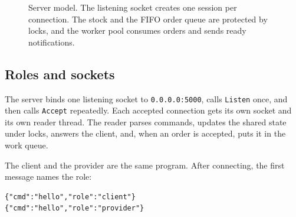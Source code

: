 \documentclass[12pt,a4paper]{article}
\begin{document}
\begin{figure}[H]
\centering
{}
\caption{Server model. The listening socket creates one session per connection.
The stock and the FIFO order queue are protected by locks, and the worker pool
consumes orders and sends ready notifications.}
\label{fig:server-model}
\end{figure}

\subsection{Roles and sockets}

The server binds one listening socket to \texttt{0.0.0.0:5000}, calls
\texttt{Listen} once, and then calls \texttt{Accept} repeatedly. Each accepted
connection gets its own socket and its own reader thread. The reader parses
commands, updates the shared state under locks, answers the client, and, when an
order is accepted, puts it in the work queue.

The client and the provider are the same program. After connecting, the first
message names the role:

\begin{lstlisting}[style=plain,caption={Handshake sent by the client or the provider.}]
{"cmd":"hello","role":"client"}
{"cmd":"hello","role":"provider"}
\end{lstlisting}
\end{document}
